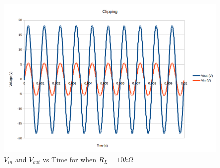 \documentclass[10pt]{article}
\begin{document}
\begin{figure}[H]
	\centering
	\includegraphics[width=\textwidth]{Clipping20V2.png}
	\caption{$V_{in}$ and $V_{out}$ vs Time for when $R_L=10k\Omega$}
\end{figure}
\end{document}

